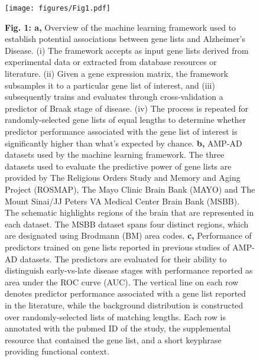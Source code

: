 \documentclass{article}
\begin{document}

\begin{landscape}
  \begin{figure}
    \begin{center}
      \texttt{[image: figures/Fig1.pdf]}
    \end{center}
    \caption*{\textbf{Fig. 1: a,} Overview of the machine learning framework used to establish potential associations between gene lists and Alzheimer’s Disease. (i) The framework accepts as input gene lists derived from experimental data or extracted from database resources or literature. (ii) Given a gene expression matrix, the framework subsamples it to a particular gene list of interest, and (iii) subsequently trains and evaluates through cross-validation a predictor of Braak stage of disease. (iv) The process is repeated for randomly-selected gene lists of equal lengths to determine whether predictor performance associated with the gene list of interest is significantly higher than what’s expected by chance. \textbf{b,} AMP-AD datasets used by the machine learning framework. The three datasets used to evaluate the predictive power of gene lists are provided by The Religious Orders Study and Memory and Aging Project (ROSMAP), The Mayo Clinic Brain Bank (MAYO) and The Mount Sinai/JJ Peters VA Medical Center Brain Bank (MSBB). The schematic highlights regions of the brain that are represented in each dataset. The MSBB dataset spans four distinct regions, which are designated using Brodmann (BM) area codes. \textbf{c,} Performance of predictors trained on gene lists reported in previous studies of AMP-AD datasets. The predictors are evaluated for their ability to distinguish early-vs-late disease stages with performance reported as area under the ROC curve (AUC). The vertical line on each row denotes predictor performance associated with a gene list reported in the literature, while the background distribution is constructed over randomly-selected lists of matching lengths. Each row is annotated with the pubmed ID of the study, the supplemental resource that contained the gene list, and a short keyphrase providing functional context.}
  \end{figure}
\end{landscape}

\newpage

\end{document}
